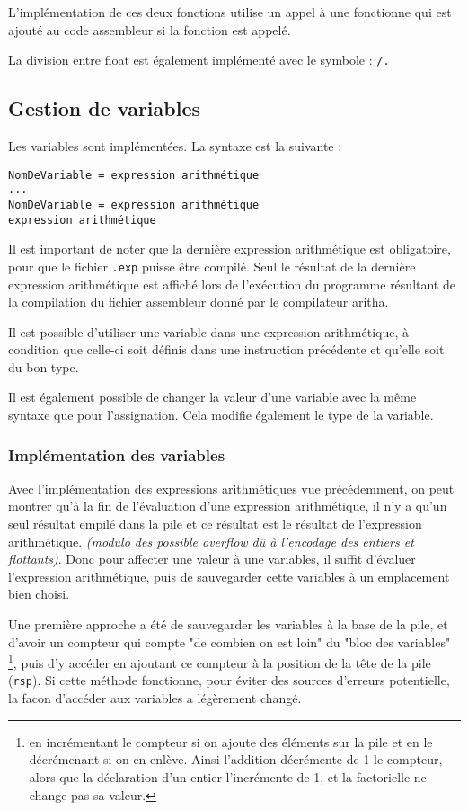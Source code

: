 \documentclass[12pt]{article}
\begin{document}
L'implémentation de ces deux fonctions utilise un appel à une fonctionne qui est ajouté au code assembleur si la fonction est appelé.

La division entre float est également implémenté avec le symbole : \verb|/.|

\subsection{Gestion de variables}
Les variables sont implémentées. La syntaxe est la suivante : 

\begin{verbatim}
NomDeVariable = expression arithmétique
...
NomDeVariable = expression arithmétique
expression arithmétique

\end{verbatim}

Il est important de noter que la dernière expression arithmétique est obligatoire, pour que le fichier \verb|.exp|
puisse être compilé. Seul le résultat de la dernière expression arithmétique est affiché lors de l'exécution
du programme résultant de la compilation du fichier assembleur donné par le compilateur aritha.

Il est possible d'utiliser une variable dans une expression arithmétique, à condition que celle-ci soit définis
dans une instruction précédente et qu'elle soit du bon type.

Il est également possible de changer la valeur d'une variable avec la même syntaxe que pour l'assignation. Cela modifie également le
type de la variable.

\subsubsection{Implémentation des variables}
Avec l'implémentation des expressions arithmétiques vue précédemment, on peut montrer qu'à la fin de l'évaluation d'une 
expression arithmétique, il n'y a qu'un seul résultat empilé dans la pile et ce résultat est le résultat de l'expression arithmétique.
\textit{(modulo des possible overflow dû à l'encodage des entiers et flottants)}.
Donc pour affecter une valeur à une variables, il suffit d'évaluer l'expression arithmétique, puis de sauvegarder cette variables à un 
emplacement bien choisi.

Une première approche a été de sauvegarder les variables à la base de la pile, et d'avoir un compteur qui compte "de combien on est loin" du 
"bloc des variables" 
\footnote{en incrémentant le compteur si on ajoute des éléments sur la pile et en le décrémenant si on en enlève. 
Ainsi l'addition décrémente de 1 le compteur, alors que la déclaration d'un entier l'incrémente de 1, et la factorielle ne change pas sa valeur.}, 
puis d'y accéder en ajoutant ce compteur à la position de la tête de la pile (\verb|rsp|). Si cette méthode fonctionne, pour
éviter des sources d'erreurs potentielle, la facon d'accéder aux variables a légèrement changé.
\end{document}
